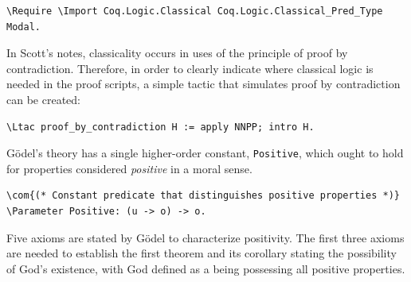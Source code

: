 \documentclass{llncs}
\newcommand{\red}[1]{\textcolor[rgb]{1,0,0}{#1}}
\newcommand{\blue}[1]{\textcolor[rgb]{0,0,1}{#1}}
\newcommand{\brown}[1]{\textcolor[rgb]{0.8,0.6,0.4}{#1}}
\newcommand{\Parameter}{\red{Parameter}}
\newcommand{\Ltac}{\red{Ltac}}
\newcommand{\Require}{\blue{Require}}
\newcommand{\Import}{\blue{Import}}
\newcommand{\com}[1]{\brown{#1}}
\begin{document}
\begin{Verbatim}[commandchars=\\\{\},fontsize=\verbsize]
\Require \Import Coq.Logic.Classical Coq.Logic.Classical_Pred_Type Modal.
\end{Verbatim}

\noindent 
In Scott's notes, classicality occurs in uses of the
principle of proof by contradiction. Therefore, in order to clearly
indicate where classical logic is needed in the proof scripts, a
simple tactic that simulates proof by contradiction can be created:

\begin{Verbatim}[commandchars=\\\{\},fontsize=\verbsize]
\Ltac proof_by_contradiction H := apply NNPP; intro H.
\end{Verbatim}


\noindent
Gödel's theory has a single higher-order constant, \texttt{Positive}, 
which ought to hold for properties considered \emph{positive} in a moral sense.

\begin{Verbatim}[commandchars=\\\{\},fontsize=\verbsize]
\com{(* Constant predicate that distinguishes positive properties *)}
\Parameter Positive: (u -> o) -> o.
\end{Verbatim}

\noindent
Five axioms are stated by Gödel to characterize positivity. 
The first three axioms are needed to establish the first theorem and 
its corollary stating the possibility of God's existence, 
with God defined as a being possessing all positive properties.
\end{document}
